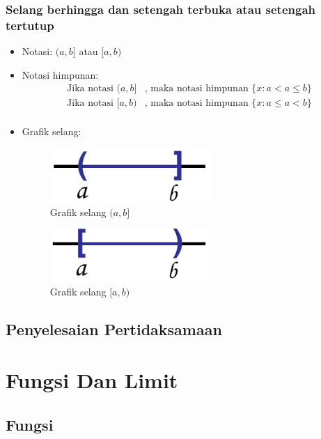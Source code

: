 \documentclass[pdflatex,compress,mathserif]{beamer}
\begin{document}
		\begin{frame}
			\frametitle{Selang berhingga dan setengah terbuka atau setengah tertutup}
			\begin{itemize}
				\item Notasi: $ (a,b] $ atau $ [a,b) $
				\item Notasi himpunan:
				\begin{align*}
					\text{Jika notasi } (a,b]& \text{, maka notasi himpunan }\{x:a < a \leq b\} \\
					\text{Jika notasi } [a,b)& \text{, maka notasi himpunan }\{x:a \leq a < b\} \\
				\end{align*}
				\item Grafik selang:
				\begin{multicols}{2}
					\begin{figure}
						\centering
						\includegraphics[width=0.5\linewidth]{pict/04}
						\caption{Grafik selang $(a,b]$}
						\label{fig:04}
					\end{figure}
					\columnbreak
					\begin{figure}
						\centering
						\includegraphics[width=0.5\linewidth]{pict/05}
						\caption{Grafik selang $[a,b)$}
						\label{fig:05}
					\end{figure}
				\end{multicols}
			\end{itemize}
		\end{frame}

	\subsection{Penyelesaian Pertidaksamaan}

\section{Fungsi Dan Limit}

	\subsection{Fungsi}
\end{document}
